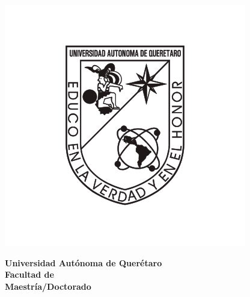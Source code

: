 

\begin{minipage}[t][0cm][c]{0.2\textwidth}
                \includegraphics[width=\linewidth]{figures/logo_UAQ.png} %
            \end{minipage}
            \hfill
            \begin{minipage}[t][0cm][c]{0.7\textwidth}
                \begin{raggedright}
                    {\Large \textbf{Universidad Autónoma de Querétaro}} \\
                    \vspace{0.2cm}
                    {\large \textbf{Facultad de \underline{\hspace{3cm}}}} \\
                    \vspace{0.2cm}
                    {\large \textbf{Maestría/Doctorado \underline{\hspace{3cm}}}} \\
                \end{raggedright}
            \end{minipage}

            \vspace{2cm}
            
